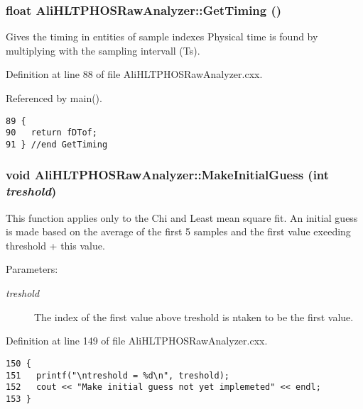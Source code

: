 \subsubsection{\setlength{\rightskip}{0pt plus 5cm}float Ali\-HLTPHOSRaw\-Analyzer::Get\-Timing ()\hspace{0.3cm}{\tt  [inherited]}}\label{classAliHLTPHOSRawAnalyzer_AliHLTPHOSRawAnalyzerPeakFindera10}


Gives the timing in entities of sample indexes Physical time is found by multiplying with the sampling intervall (Ts). 

Definition at line 88 of file Ali\-HLTPHOSRaw\-Analyzer.cxx.

Referenced by main().

\footnotesize\begin{verbatim}89 {
90   return fDTof;
91 } //end GetTiming
\end{verbatim}\normalsize 


\subsubsection{\setlength{\rightskip}{0pt plus 5cm}void Ali\-HLTPHOSRaw\-Analyzer::Make\-Initial\-Guess (int {\em treshold})\hspace{0.3cm}{\tt  [inherited]}}\label{classAliHLTPHOSRawAnalyzer_AliHLTPHOSRawAnalyzerPeakFindera16}


This function applies only to the Chi and Least mean square fit. An initial guess is made based on the average of the first 5 samples and the first value exeeding threshold + this value. \begin{Desc}
\item[Parameters:]
\begin{description}
\item[{\em treshold}]The index of the first value above treshold is ntaken to be the first value. \end{description}
\end{Desc}


Definition at line 149 of file Ali\-HLTPHOSRaw\-Analyzer.cxx.

\footnotesize\begin{verbatim}150 {
151   printf("\ntreshold = %d\n", treshold);
152   cout << "Make initial guess not yet implemeted" << endl;  
153 }
\end{verbatim}\normalsize 



